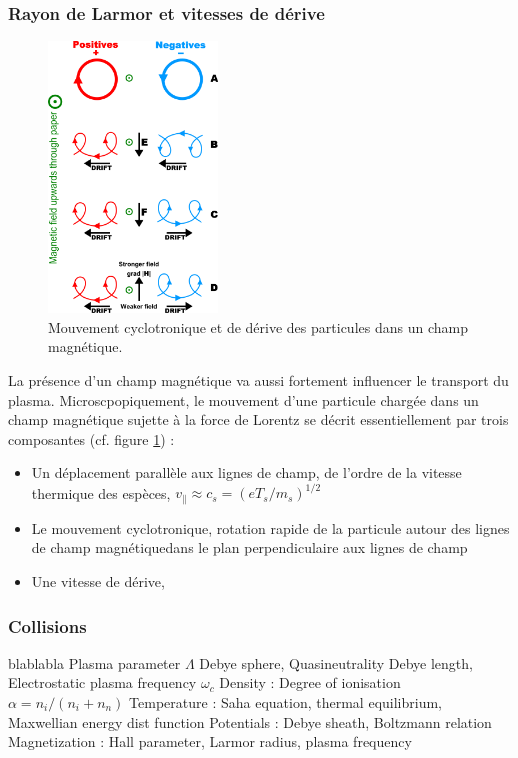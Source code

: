 			\subsubsection{Rayon de Larmor et vitesses de dérive}
			\begin{figure}
    			\vspace{-5pt}
    			\hspace{20pt}\includegraphics[width=0.40\textwidth]{figures/particleDrifts.png}
    			\hspace{20pt}\caption{Mouvement cyclotronique et de dérive des particules
    			dans un champ magnétique.}\label{particleDrifts}
  				 \vspace{-20pt}
			\end{figure}
			La présence d'un champ magnétique va aussi fortement influencer le transport
			du plasma. Microscpopiquement, le mouvement d'une particule chargée dans un
			champ magnétique sujette à la force de Lorentz se décrit essentiellement par trois
			composantes (cf. figure \ref{particleDrifts}) :
			
			
			\begin{itemize}
			\item Un déplacement parallèle aux lignes de champ, de l'ordre de la vitesse
			thermique des espèces, $v_\parallel\approx c_s=(eT_s/m_s)^{1/2}$
			\item Le mouvement cyclotronique, rotation rapide de la particule
			autour des lignes de champ magnétiquedans le plan perpendiculaire aux lignes
			de champ
			\item Une vitesse de dérive, 
			\end{itemize}
			\lipsum
			\subsubsection{Collisions}
			blablabla
		 Plasma parameter $\Lambda$ Debye sphere, Quasineutrality Debye length,
		Electrostatic plasma frequency $\omega_c$
		 Density : Degree of ionisation $\alpha=n_i/(n_i+n_n)$
			Temperature : Saha equation, thermal equilibrium, Maxwellian energy dist function
			Potentials : Debye sheath, Boltzmann relation
			Magnetization : Hall parameter, Larmor radius, plasma frequency
			
